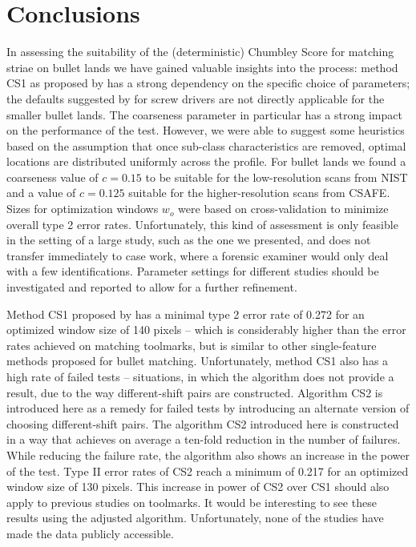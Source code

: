 \documentclass[12pt]{article}
\begin{document}
\hypertarget{conclusions}{%
\section*{Conclusions}\label{conclusions}}

In assessing the suitability of the (deterministic) Chumbley Score for
matching striae on bullet lands we have gained valuable insights into
the process: method CS1 as proposed by \citet{hadler} has a strong
dependency on the specific choice of parameters; the defaults suggested
by \citet{hadler} for screw drivers are not directly applicable for the
smaller bullet lands. The coarseness parameter in particular has a
strong impact on the performance of the test. However, we were able to
suggest some heuristics based on the assumption that once sub-class
characteristics are removed, optimal locations are distributed uniformly
across the profile. For bullet lands we found a coarseness value of
\(c = 0.15\) to be suitable for the low-resolution scans from NIST and a
value of \(c=0.125\) suitable for the higher-resolution scans from
CSAFE. Sizes for optimization windows \(w_o\) were based on
cross-validation to minimize overall type 2 error rates. Unfortunately,
this kind of assessment is only feasible in the setting of a large
study, such as the one we presented, and does not transfer immediately
to case work, where a forensic examiner would only deal with a few
identifications. Parameter settings for different studies should be
investigated and reported to allow for a further refinement.

Method CS1 proposed by \citet{hadler} has a minimal type 2 error rate of
0.272 for an optimized window size of 140 pixels -- which is
considerably higher than the error rates achieved on matching toolmarks,
but is similar to other single-feature methods proposed for bullet
matching. Unfortunately, method CS1 also has a high rate of failed tests
-- situations, in which the algorithm does not provide a result, due to
the way different-shift pairs are constructed. Algorithm CS2 is
introduced here as a remedy for failed tests by introducing an alternate
version of choosing different-shift pairs. The algorithm CS2 introduced
here is constructed in a way that achieves on average a ten-fold
reduction in the number of failures. While reducing the failure rate,
the algorithm also shows an increase in the power of the test. Type II
error rates of CS2 reach a minimum of 0.217 for an optimized window size
of 130 pixels. This increase in power of CS2 over CS1 should also apply
to previous studies on toolmarks. It would be interesting to see these
results using the adjusted algorithm. Unfortunately, none of the studies
have made the data publicly accessible.
\end{document}
